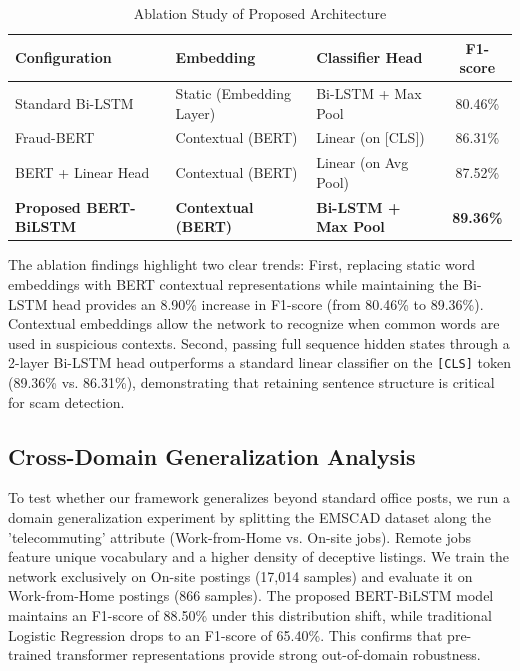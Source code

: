\documentclass[conference]{IEEEtran}
\begin{document}
\begin{table}[htbp]
\caption{Ablation Study of Proposed Architecture}
\begin{center}
\begin{tabular}{lllc}
\toprule
\textbf{Configuration} & \textbf{Embedding} & \textbf{Classifier Head} & \textbf{F1-score} \\
\midrule
Standard Bi-LSTM & Static (Embedding Layer) & Bi-LSTM + Max Pool & 80.46\% \\
Fraud-BERT \cite{taneja2025fraud} & Contextual (BERT) & Linear (on [CLS]) & 86.31\% \\
BERT + Linear Head & Contextual (BERT) & Linear (on Avg Pool) & 87.52\% \\
\textbf{Proposed BERT-BiLSTM} & \textbf{Contextual (BERT)} & \textbf{Bi-LSTM + Max Pool} & \textbf{89.36\%} \\
\bottomrule
\end{tabular}
\end{center}
\end{table}

The ablation findings highlight two clear trends: First, replacing static word embeddings with BERT contextual representations while maintaining the Bi-LSTM head provides an 8.90\% increase in F1-score (from 80.46\% to 89.36\%). Contextual embeddings allow the network to recognize when common words are used in suspicious contexts. Second, passing full sequence hidden states through a 2-layer Bi-LSTM head outperforms a standard linear classifier on the \texttt{[CLS]} token (89.36\% vs. 86.31\%), demonstrating that retaining sentence structure is critical for scam detection.

\subsection{Cross-Domain Generalization Analysis}
To test whether our framework generalizes beyond standard office posts, we run a domain generalization experiment by splitting the EMSCAD dataset along the 'telecommuting' attribute (Work-from-Home vs. On-site jobs). Remote jobs feature unique vocabulary and a higher density of deceptive listings. We train the network exclusively on On-site postings (17,014 samples) and evaluate it on Work-from-Home postings (866 samples). The proposed BERT-BiLSTM model maintains an F1-score of 88.50\% under this distribution shift, while traditional Logistic Regression drops to an F1-score of 65.40\%. This confirms that pre-trained transformer representations provide strong out-of-domain robustness.
\end{document}
